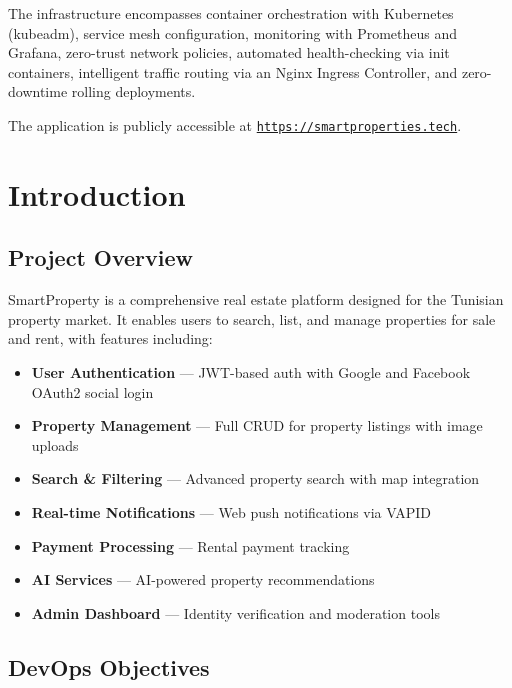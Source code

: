 \documentclass[12pt,a4paper]{report}
\begin{document}
The infrastructure encompasses container orchestration with Kubernetes (kubeadm), service mesh configuration, monitoring with Prometheus and Grafana, zero-trust network policies, automated health-checking via init containers, intelligent traffic routing via an Nginx Ingress Controller, and zero-downtime rolling deployments.

The application is publicly accessible at \href{https://smartproperties.tech}{\texttt{https://smartproperties.tech}}.

\tableofcontents

\chapter{Introduction}

\section{Project Overview}

SmartProperty is a comprehensive real estate platform designed for the Tunisian property market. It enables users to search, list, and manage properties for sale and rent, with features including:

\begin{itemize}[leftmargin=1.5cm]
  \item \textbf{User Authentication} --- JWT-based auth with Google and Facebook OAuth2 social login
  \item \textbf{Property Management} --- Full CRUD for property listings with image uploads
  \item \textbf{Search \& Filtering} --- Advanced property search with map integration
  \item \textbf{Real-time Notifications} --- Web push notifications via VAPID
  \item \textbf{Payment Processing} --- Rental payment tracking
  \item \textbf{AI Services} --- AI-powered property recommendations
  \item \textbf{Admin Dashboard} --- Identity verification and moderation tools
\end{itemize}

\section{DevOps Objectives}
\end{document}
